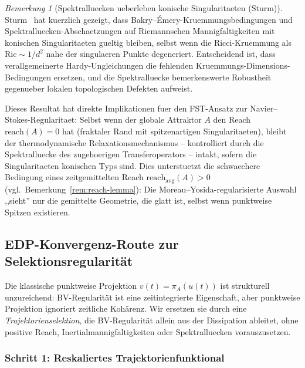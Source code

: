 \documentclass[12pt,a4paper]{article}
\theoremstyle{definition}
\theoremstyle{plain}
\theoremstyle{remark}
\newtheorem{remark}[definition]{Bemerkung}
\begin{document}
\begin{remark}[Spektralluecken ueberleben konische Singularitaeten (Sturm)]
\label{rem:sturm-conical}
Sturm~\cite{Sturm2025} hat kuerzlich gezeigt, dass Bakry--\'Emery-Kruemmungsbedingungen und Spektralluecken-Abschaetzungen auf Riemannschen Mannigfaltigkeiten mit konischen Singularitaeten gueltig bleiben, selbst wenn die Ricci-Kruemmung als $\mathrm{Ric} \sim 1/d^2$ nahe der singulaeren Punkte degeneriert. Entscheidend ist, dass verallgemeinerte Hardy-Ungleichungen die fehlenden Kruemmungs-Dimensions-Bedingungen ersetzen, und die Spektralluecke bemerkenswerte Robustheit gegenueber lokalen topologischen Defekten aufweist.

Dieses Resultat hat direkte Implikationen fuer den FST-Ansatz zur Navier--Stokes-Regularitaet: Selbst wenn der globale Attraktor $A$ den Reach $\mathrm{reach}(A) = 0$ hat (fraktaler Rand mit spitzenartigen Singularitaeten), bleibt der thermodynamische Relaxationsmechanismus -- kontrolliert durch die Spektralluecke des zugehoerigen Transferoperators -- intakt, sofern die Singularitaeten konischen Typs sind. Dies unterstuetzt die schwaechere Bedingung eines zeitgemittelten Reach $\mathrm{reach}_{\mathrm{avg}}(A) > 0$ (vgl.\ Bemerkung~\ref{rem:reach-lemma}): Die Moreau--Yosida-regularisierte Auswahl ,,sieht'' nur die gemittelte Geometrie, die glatt ist, selbst wenn punktweise Spitzen existieren.
\end{remark}

\subsection{EDP-Konvergenz-Route zur Selektionsregularit\"at}\label{sec:gamma-edp-selection}

Die klassische punktweise Projektion $v(t) = \pi_A(u(t))$ ist strukturell unzureichend: BV-Regularit\"at ist eine zeitintegrierte Eigenschaft, aber punktweise Projektion ignoriert zeitliche Koh\"arenz. Wir ersetzen sie durch eine \emph{Trajektorienselektion}, die BV-Regularit\"at allein aus der Dissipation ableitet, ohne positive Reach, Inertialmannigfaltigkeiten oder Spektralluecken vorauszusetzen.

\subsubsection*{Schritt 1: Reskaliertes Trajektorienfunktional}
\end{document}
